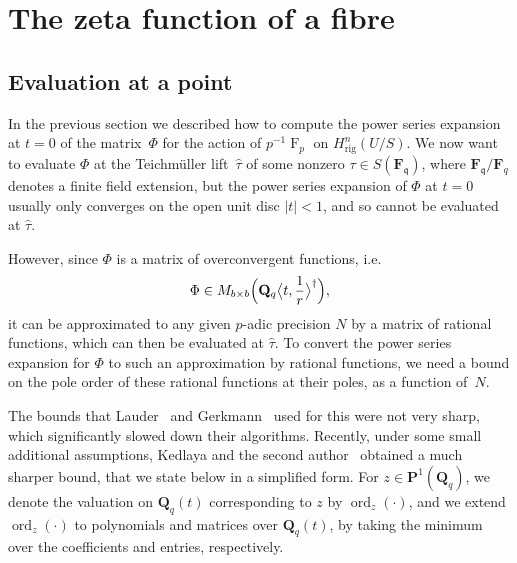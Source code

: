 \documentclass[a4paper,11pt]{article}
\numberwithin{equation}{section}
\providecommand{\abs}[1]{\lvert#1\rvert}                 %
\newcommand{\QQ}{\mathbf{Q}} %
\newcommand{\FF}{\mathbf{F}} %
\DeclareMathOperator{\ord}{ord}          %
\DeclareMathOperator{\Frob}{F}           %
\providecommand{\Hrig}{H_{\text{rig}}}  %
\theoremstyle{definition}
\begin{document}

\section{The zeta function of a fibre}

\label{sec:ZetaFunctions}

\subsection{Evaluation at a point}

In the previous section we described how to compute the power series 
expansion at $t=0$ of the matrix~$\Phi$ for the action of $p^{-1} \Frob_p$ on 
$\Hrig^{n}(U/S)$. We now want to evaluate $\Phi$ at the Teichm\"uller 
lift~$\hat{\tau}$ of some nonzero $\tau \in S(\FF_{\mathfrak{q}})$, 
where $\FF_{\mathfrak{q}}/\FF_q$ denotes a finite field extension, but 
the power series expansion of $\Phi$ 
at $t=0$ usually only converges on the open unit disc $\abs{t} < 1$, 
and so cannot be evaluated at $\hat{\tau}$. 

However, since $\Phi$ is a matrix of overconvergent functions, i.e.\ 
\[
\Phi \in M_{b \times b}\Bigl(\QQ_q \bigl\langle t,\frac{1}{r} \bigr\rangle^{\dag}\Bigr),
\]
it can be approximated to any given $p$-adic precision $N$ by a matrix 
of rational functions, which can then be evaluated at $\hat{\tau}$. To 
convert the power series expansion for $\Phi$ to such an approximation 
by rational functions, we need a bound on the pole order of these 
rational functions at their poles, as a function of~$N$.

The bounds that Lauder~\citep[\S 8.1]{Lauder2004a} and 
Gerkmann~\citep[\S 6]{Gerkmann2007} used for this were not very
sharp, which significantly slowed down their algorithms.
Recently, under some small additional assumptions, Kedlaya and the second 
author~\citep[Theorem~2.1]{KedlayaTuitman2012} obtained a much sharper bound,
that we state below in a simplified form. For $z \in \mathbf{P}^1(\QQ_q)$, we
denote the valuation on $\QQ_q(t)$ corresponding to $z$ by $\ord_z(\cdot)$, and
we extend $\ord_z(\cdot)$ to polynomials and matrices over $\QQ_q(t)$, by
taking the minimum over the coefficients and entries, respectively.
\end{document}
